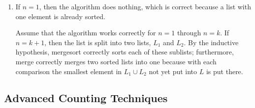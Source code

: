 \documentclass{../../cls/sig-alternate-05-2015}
\begin{document}
\begin{enumerate}
\item If $n = 1$,
then the algorithm does nothing,
which is correct because a list with one element is already sorted.

Assume that the algorithm works correctly for $n = 1$ through $n = k$.
If $n = k + 1$, then the list is split into two lists,
$L_1$ and $L_2$.
By the inductive hypothesis,
mergesort correctly sorts each of these sublists;
furthermore,
merge correctly merges two sorted lists into one because with each comparison the smallest element in $L_1 \cup L_2$ not yet put into $L$ is put there.

\end{enumerate}

\subsection{Advanced Counting Techniques}
\end{document}
